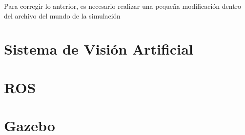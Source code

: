 Para corregir lo anterior, es necesario realizar una pequeña modificación dentro del archivo del mundo de la simulación

\section{Sistema de Visión Artificial}

\section{ROS}

\section{Gazebo}

